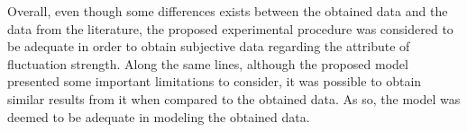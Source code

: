 \documentclass{scrartcl}
\begin{document}
Overall, even though some differences exists between the obtained data and the
data from the literature, the proposed experimental procedure was considered
to be adequate in order to obtain subjective data regarding the attribute of
fluctuation strength. Along the same lines, although the proposed model
presented some important limitations to consider, it was possible to obtain
similar results from it when compared to the obtained data. As so, the model
was deemed to be adequate in modeling the obtained data.
\end{document}
